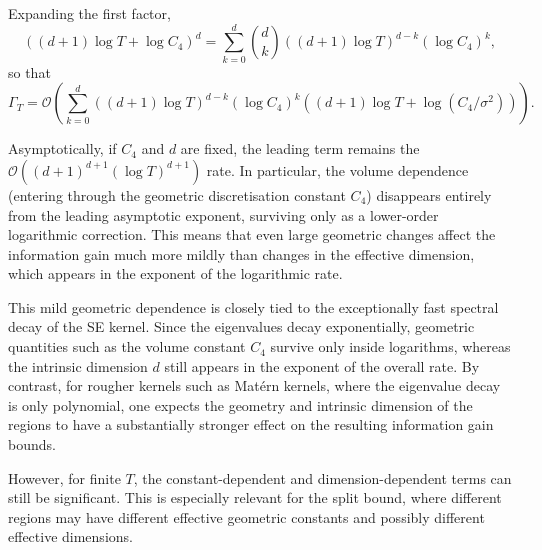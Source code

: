 \begin{remark}

Expanding the first factor,
\begin{equation*}
\left(
(d+1)\log T+\log C_4
\right)^d
=
\sum_{k=0}^d
\binom{d}{k}
\left(
(d+1)\log T
\right)^{d-k}
(\log C_4)^k,
\end{equation*}
so that
\begin{equation*}
\Gamma_T
=
\mathcal{O}
\left(
\sum_{k=0}^d
\left(
(d+1)\log T
\right)^{d-k}
(\log C_4)^k
\left(
(d+1)\log T+\log(C_4/\sigma^2)
\right)
\right).
\end{equation*}

Asymptotically, if $C_4$ and $d$ are fixed, the leading term remains the $\mathcal{O}\left((d+1)^{d+1}(\log T)^{d+1}\right)$
rate. In particular, the volume dependence (entering through the geometric discretisation constant $C_4$) disappears entirely from the leading asymptotic exponent, surviving only as a lower-order logarithmic correction. This means that even large geometric changes affect the information gain much more mildly than changes in the effective dimension, which appears in the exponent of the logarithmic rate. 

This mild geometric dependence is closely tied to the exceptionally fast spectral decay of the SE kernel. Since the eigenvalues decay exponentially, geometric quantities such as the volume constant $C_4$ survive only inside logarithms, whereas the intrinsic dimension $d$ still appears in the exponent of the overall rate. By contrast, for rougher kernels such as Mat\'ern kernels, where the eigenvalue decay is only polynomial, one expects the geometry and intrinsic dimension of the regions to have a substantially stronger effect on the resulting information gain bounds.

However, for finite $T$, the constant-dependent and dimension-dependent terms can still be significant. This is especially relevant for the split bound, where different regions may have different effective geometric constants and possibly different effective dimensions.


\end{remark}
